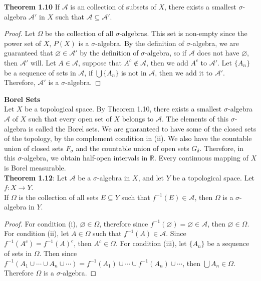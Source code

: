 \documentclass[12pt]{article}
\let\emptyset\varnothing
\begin{document}
\noindent \textbf{Theorem 1.10} If $\mathcal{A}$ is an collection of subsets of $X$, there exists a smallest $\sigma$-algebra $\mathcal{A}'$ in $X$ such that $\mathcal{A} \subseteq \mathcal{A}'$.  

\begin{proof}
Let $\Omega$ be the collection of all $\sigma$-algebras. This set is non-empty since the power set of $X$, $P(X)$ is a $\sigma$-algebra. By the definition of $\sigma$-algebra, we are guaranteed that $\emptyset \in \mathcal{A}'$ by the definition of $\sigma$-algebra, so if $\mathcal{A}$ does not have $\emptyset$, then $\mathcal{A}'$ will. Let $A \in \mathcal{A}$, suppose that $A^c \not \in \mathcal{A}$, then we add $A^c$ to $\mathcal{A}'$. Let $\{A_n\}$ be a sequence of sets in $\mathcal{A}$, if $\bigcup \{A_n\}$ is not in $\mathcal{A}$, then we add it to $\mathcal{A}'$. Therefore, $\mathcal{A}'$ is a $\sigma$-algebra.    
\end{proof}

\noindent \textbf{Borel Sets} \\
\noindent Let $X$ be a topological space. By Theorem 1.10, there exists a smallest $\sigma$-algebra $\mathcal{A}$ of $X$ such that every open set of $X$ belongs to $\mathcal{A}$. The elements of this $\sigma$-algebra is called the Borel sets. We are guaranteed to have some of the closed sets of the topology, by the complement condition in (ii). We also have the countable union of closed sets $F_{\sigma}$ and the countable union of open sets $G_{\delta}$. Therefore, in this $\sigma$-algebra, we obtain half-open intervals in $\mathbb{R}$. 
Every continuous mapping of $X$ is Borel measurable. \\

\noindent \textbf{Theorem 1.12}: Let $\mathcal{A}$ be a $\sigma$-algebra in $X$, and let $Y$ be a topological space. Let $f:X\rightarrow Y$. \\

\noindent If $\Omega$ is the collection of all sets $E \subseteq Y$ such that $f^{-1}(E) \in \mathcal{A}$, then $\Omega$ is a $\sigma$-algebra in $Y$. 
\begin{proof}
For condition (i), $\emptyset \in \Omega$, therefore since $f^{-1}(\emptyset) = \emptyset \in \mathcal{A}$, then $\emptyset \in \Omega$. For condition (ii), let $A \in \Omega$ such that $f^{-1}(A) \in \mathcal{A}$. Since $f^{-1}(A^c)= f^{-1}(A)^c$, then $A^c \in \Omega$. For condition (iii), let $\{A_n\}$ be a sequence of sets in $\Omega$. Then since $f^{-1}(A_1 \cup \cdots \cup A_n \cup \cdots) = f^{-1}(A_1) \cup \cdots \cup f^{-1}(A_n) \cup \cdots$, then $\bigcup A_n \in \Omega$. Therefore $\Omega$ is a $\sigma$-algebra.  
\end{proof} 
\end{document}
